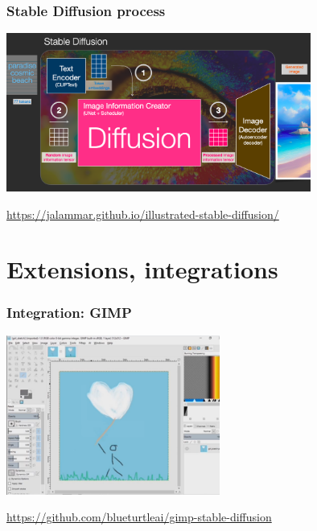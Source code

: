 \documentclass[17pt,aspectratio=169,hyperref={pdfusetitle,colorlinks,allcolors=olive}]{beamer}
\begin{document}
\begin{frame}[fragile]
  \frametitle{Stable Diffusion process}

      \includegraphics[width=10cm]{figs/sd-process}

  \begin{flushright}
    {\scriptsize
    \url{https://jalammar.github.io/illustrated-stable-diffusion/}
    }
  \end{flushright}

\end{frame}


\section{Extensions, integrations}

\begin{frame}[fragile]
  \frametitle{Integration: GIMP}

    \begin{center}
    \includegraphics[width=7cm]{figs/sd-gimp}
  \end{center}

  \begin{flushright}
    {\scriptsize
    \url{https://github.com/blueturtleai/gimp-stable-diffusion} \\
    }
  \end{flushright}
  
\end{frame}
\end{document}
